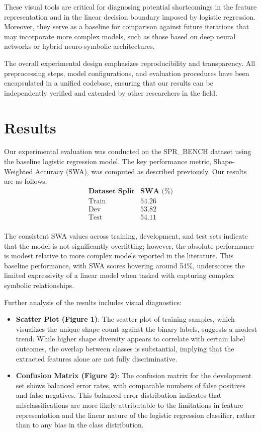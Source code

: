 \documentclass{article}
\begin{document}
These visual tools are critical for diagnosing potential shortcomings in the feature representation and in the linear decision boundary imposed by logistic regression. Moreover, they serve as a baseline for comparison against future iterations that may incorporate more complex models, such as those based on deep neural networks or hybrid neuro-symbolic architectures.

The overall experimental design emphasizes reproducibility and transparency. All preprocessing steps, model configurations, and evaluation procedures have been encapsulated in a unified codebase, ensuring that our results can be independently verified and extended by other researchers in the field.

\section{Results}
Our experimental evaluation was conducted on the SPR\_BENCH dataset using the baseline logistic regression model. The key performance metric, Shape-Weighted Accuracy (SWA), was computed as described previously. Our results are as follows:
\[
\begin{array}{l|c}
\textbf{Dataset Split} & \textbf{SWA (\%)} \\ \hline
\text{Train} & 54.26 \\
\text{Dev}   & 53.82 \\
\text{Test}  & 54.11 \\
\end{array}
\]

The consistent SWA values across training, development, and test sets indicate that the model is not significantly overfitting; however, the absolute performance is modest relative to more complex models reported in the literature. This baseline performance, with SWA scores hovering around 54\%, underscores the limited expressivity of a linear model when tasked with capturing complex symbolic relationships.

Further analysis of the results includes visual diagnostics:
\begin{itemize}
    \item \textbf{Scatter Plot (Figure 1)}: The scatter plot of training samples, which visualizes the unique shape count against the binary labels, suggests a modest trend. While higher shape diversity appears to correlate with certain label outcomes, the overlap between classes is substantial, implying that the extracted features alone are not fully discriminative.
    \item \textbf{Confusion Matrix (Figure 2)}: The confusion matrix for the development set shows balanced error rates, with comparable numbers of false positives and false negatives. This balanced error distribution indicates that misclassifications are more likely attributable to the limitations in feature representation and the linear nature of the logistic regression classifier, rather than to any bias in the class distribution.
\end{itemize}
\end{document}

